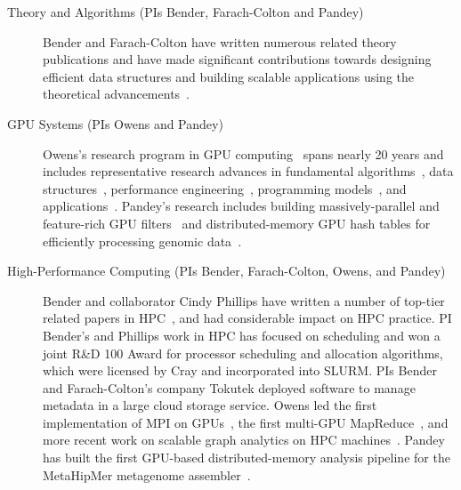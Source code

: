 \begin{description}
    \item[Theory and Algorithms (PIs Bender, Farach-Colton and Pandey)]
    Bender and Farach-Colton have written numerous related theory publications and have made significant contributions towards designing efficient data structures and building scalable applications using the theoretical advancements~\cite{BenderFaGo18,BenderFaJo12,BenderFaJo12a,PandeyBJ17,PandeyABFJP18Cell,PandeyBJP17a,PandeyBJP17b,conway2018optimal,JannenYuZh15a,JannenYuZh15b,YuanZhJa16,pandey2021terrace,pandey2021variantstore,pandey2022iceberght}.

    \item[GPU Systems (PIs Owens and Pandey)] Owens's research program in GPU computing~\cite{Owens:2007:ASO,Owens:2008:GC} spans nearly 20 years and includes representative research advances in fundamental algorithms~\cite{Sengupta:2007:SPF}, data structures~\cite{Lefohn:2006:GGE,Alcantara:2009:RPH}, %
    performance engineering~\cite{Zhang:2011:AQP}, programming models~\cite{Gupta:2012:ASO, Tzeng:2010:TMF}, and applications~\cite{Wang:2017:GGG}. Pandey's research includes building massively-parallel and feature-rich GPU filters~\cite{mccoy2022high} and distributed-memory GPU hash tables for efficiently processing genomic data~\cite{nisa2021distributed}.

    \item[High-Performance Computing (PIs Bender, Farach-Colton, Owens, and
        Pandey)] Bender and collaborator Cindy Phillips have
      written a number of top-tier related papers in HPC~\cite{PandeySMB20,bender2017two,eckstein2015pebbl,agrawal1989four,bender2008communication,greenberg1999enabling},
      and had considerable impact on HPC practice.
      PI Bender’s and Phillips work in HPC has focused on scheduling and  won a joint R\&D 100 Award for processor scheduling and allocation algorithms, which were licensed by Cray and incorporated into SLURM\@.  PIs Bender and Farach-Colton's company Tokutek deployed software to manage metadata in a large cloud storage service. Owens led the first implementation of MPI on GPUs~\cite{Stuart:2009:MPO:withouturl,Stuart:2011:EMT}, the first multi-GPU MapReduce~\cite{Stuart:2011:MMO}, and more recent work on scalable graph analytics on HPC machines~\cite{Pan:2018:SBS,Pan:2017:MGA,Chen:2022:SIP}. Pandey has built the first GPU-based distributed-memory \kmer analysis pipeline for the MetaHipMer metagenome assembler~\cite{nisa2021distributed}.


\end{description}
